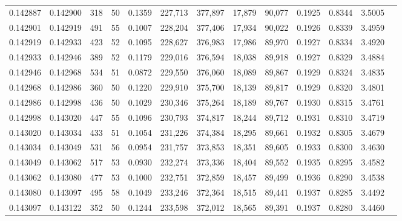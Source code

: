 \begin{tabular}{rrrrrrrrrrrrr}
0.142887 & 0.142900 &   318 &  50 &                                     0.1359 & 227,713 & 377,897 &  17,879 &  90,077 & 0.1925 & 0.8344 & 3.5005 \\
0.142901 & 0.142919 &   491 &  55 &                                     0.1007 & 228,204 & 377,406 &  17,934 &  90,022 & 0.1926 & 0.8339 & 3.4959 \\
0.142919 & 0.142933 &   423 &  52 &                                     0.1095 & 228,627 & 376,983 &  17,986 &  89,970 & 0.1927 & 0.8334 & 3.4920 \\
0.142933 & 0.142946 &   389 &  52 &                                     0.1179 & 229,016 & 376,594 &  18,038 &  89,918 & 0.1927 & 0.8329 & 3.4884 \\
0.142946 & 0.142968 &   534 &  51 &                                     0.0872 & 229,550 & 376,060 &  18,089 &  89,867 & 0.1929 & 0.8324 & 3.4835 \\
0.142968 & 0.142986 &   360 &  50 &                                     0.1220 & 229,910 & 375,700 &  18,139 &  89,817 & 0.1929 & 0.8320 & 3.4801 \\
0.142986 & 0.142998 &   436 &  50 &                                     0.1029 & 230,346 & 375,264 &  18,189 &  89,767 & 0.1930 & 0.8315 & 3.4761 \\
0.142998 & 0.143020 &   447 &  55 &                                     0.1096 & 230,793 & 374,817 &  18,244 &  89,712 & 0.1931 & 0.8310 & 3.4719 \\
0.143020 & 0.143034 &   433 &  51 &                                     0.1054 & 231,226 & 374,384 &  18,295 &  89,661 & 0.1932 & 0.8305 & 3.4679 \\
0.143034 & 0.143049 &   531 &  56 &                                     0.0954 & 231,757 & 373,853 &  18,351 &  89,605 & 0.1933 & 0.8300 & 3.4630 \\
0.143049 & 0.143062 &   517 &  53 &                                     0.0930 & 232,274 & 373,336 &  18,404 &  89,552 & 0.1935 & 0.8295 & 3.4582 \\
0.143062 & 0.143080 &   477 &  53 &                                     0.1000 & 232,751 & 372,859 &  18,457 &  89,499 & 0.1936 & 0.8290 & 3.4538 \\
0.143080 & 0.143097 &   495 &  58 &                                     0.1049 & 233,246 & 372,364 &  18,515 &  89,441 & 0.1937 & 0.8285 & 3.4492 \\
0.143097 & 0.143122 &   352 &  50 &                                     0.1244 & 233,598 & 372,012 &  18,565 &  89,391 & 0.1937 & 0.8280 & 3.4460 \\

\end{tabular}
